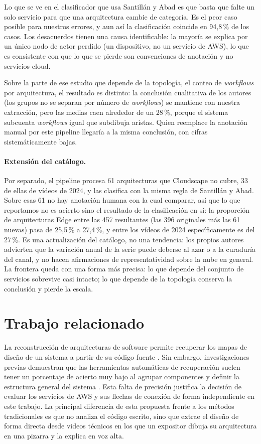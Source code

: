 \documentclass[a4paper, twocolumn, 10pt]{IEEEtran}
\begin{document}
Lo que se ve en el clasificador que usa Santillán y Abad es que basta que falte un solo servicio para que una arquitectura cambie de categoría. Es el peor caso posible para nuestros errores, y aun así la clasificación coincide en 94,8\,\% de los casos. Los desacuerdos tienen una causa identificable: la mayoría se explica por un único nodo de actor perdido (un dispositivo, no un servicio de AWS), lo que es consistente con que lo que se pierde son convenciones de anotación y no servicios cloud.

Sobre la parte de ese estudio que depende de la topología, el conteo de \emph{workflows} por arquitectura, el resultado es distinto: la conclusión cualitativa de los autores (los grupos no se separan por número de \emph{workflows}) se mantiene con nuestra extracción, pero las medias caen alrededor de un 28\,\%, porque el sistema subcuenta \emph{workflows} igual que subdibuja aristas. Quien reemplace la anotación manual por este pipeline llegaría a la misma conclusión, con cifras sistemáticamente bajas.

\paragraph{Extensión del catálogo.} Por separado, el pipeline procesa 61 arquitecturas que Cloudscape no cubre, 33 de ellas de vídeos de 2024, y las clasifica con la misma regla de Santillán y Abad. Sobre esas 61 no hay anotación humana con la cual comparar, así que lo que reportamos no es acierto sino el resultado de la clasificación en sí: la proporción de arquitecturas Edge entre las 457 resultantes (las 396 originales más las 61 nuevas) pasa de 25,5\,\% a 27,4\,\%, y entre los vídeos de 2024 específicamente es del 27\,\%. Es una actualización del catálogo, no una tendencia: los propios autores advierten que la variación anual de la serie puede deberse al azar o a la curaduría del canal, y no hacen afirmaciones de representatividad sobre la nube en general. La frontera queda con una forma más precisa: lo que depende del conjunto de servicios sobrevive casi intacto; lo que depende de la topología conserva la conclusión y pierde la escala.

 
\section{Trabajo relacionado}
La reconstrucción de arquitecturas de software permite recuperar los mapas de diseño de un sistema a partir de su código fuente \cite{Ducasse2009SAR}. Sin embargo, investigaciones previas demuestran que las herramientas automáticas de recuperación suelen tener un porcentaje de acierto muy bajo al agrupar componentes y definir la estructura general del sistema \cite{Garcia2013ComparativeSAR}. Esta falta de precisión justifica la decisión de evaluar los servicios de AWS y sus flechas de conexión de forma independiente en este trabajo. La principal diferencia de esta propuesta frente a los métodos tradicionales es que no analiza el código escrito, sino que extrae el diseño de forma directa desde videos técnicos en los que un expositor dibuja su arquitectura en una pizarra y la explica en voz alta.
 
\end{document}
